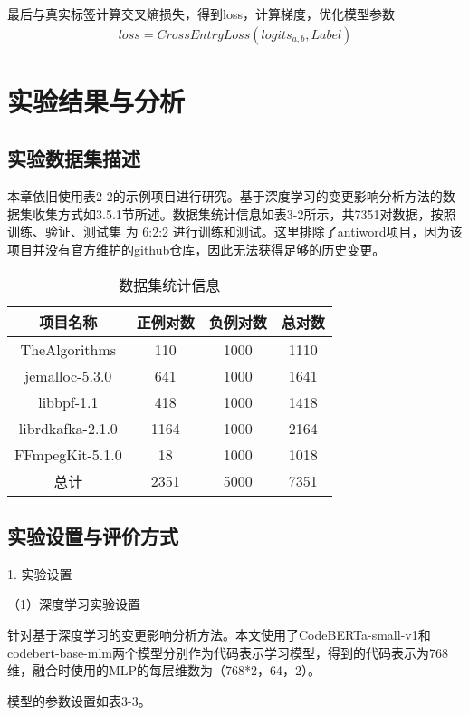 最后与真实标签计算交叉熵损失，得到loss，计算梯度，优化模型参数
\begin{align}
loss=CrossEntryLoss(logits_{a,b}, Label)
\end{align}

\section{实验结果与分析}

\subsection{实验数据集描述}

本章依旧使用表2-2的示例项目进行研究。基于深度学习的变更影响分析方法的数据集收集方式如3.5.1节所述。数据集统计信息如表3-2所示，共7351对数据，按照训练、验证、测试集 为 6:2:2 进行训练和测试。这里排除了antiword项目，因为该项目并没有官方维护的github仓库，因此无法获得足够的历史变更。

\begin{table}[htbp]
\caption{数据集统计信息}
\vspace{0.5em}\centering\wuhao
\begin{tabular}{cccc}
\toprule
项目名称 & 正例对数 & 负例对数 & 总对数 \\
\midrule
TheAlgorithms & 110 & 1000 & 1110 \\
jemalloc-5.3.0 & 641 & 1000 & 1641 \\
libbpf-1.1 & 418 & 1000 & 1418 \\
librdkafka-2.1.0 & 1164  & 1000 & 2164 \\
FFmpegKit-5.1.0 & 18 & 1000 & 1018 \\ 
总计 & 2351 & 5000 & 7351 \\
\bottomrule
\end{tabular}
\end{table}

\subsection{实验设置与评价方式}
1. 实验设置

（1）深度学习实验设置

针对基于深度学习的变更影响分析方法。本文使用了CodeBERTa-small-v1和codebert-base-mlm两个模型分别作为代码表示学习模型，得到的代码表示为768维，融合时使用的MLP的每层维数为（768*2，64，2）。

模型的参数设置如表3-3。

